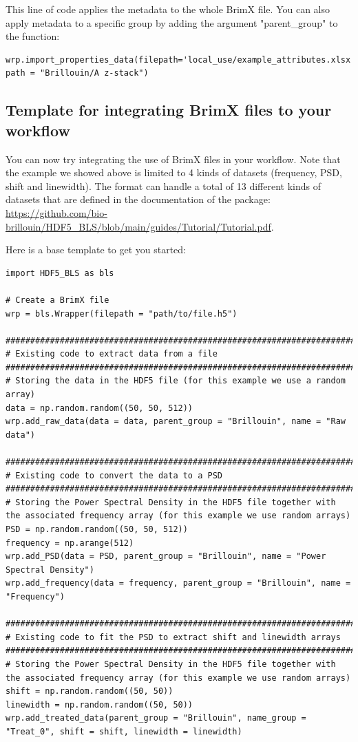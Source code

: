 \documentclass{article}
\begin{document}
This line of code applies the metadata to the whole BrimX file. You can also apply metadata to a specific group by adding the argument "parent\_group" to the function:

\begin{lstlisting}
wrp.import_properties_data(filepath='local_use/example_attributes.xlsx', path = "Brillouin/A z-stack")
\end{lstlisting}


\subsection{Template for integrating BrimX files to your workflow}

You can now try integrating the use of BrimX files in your workflow. Note that the example we showed above is limited to 4 kinds of datasets (frequency, PSD, shift and linewidth). The format can handle a total of 13 different kinds of datasets that are defined in the documentation of the package: \url{https://github.com/bio-brillouin/HDF5_BLS/blob/main/guides/Tutorial/Tutorial.pdf}.

Here is a base template to get you started:

\begin{lstlisting}
import HDF5_BLS as bls

# Create a BrimX file
wrp = bls.Wrapper(filepath = "path/to/file.h5")

###############################################################################
# Existing code to extract data from a file
###############################################################################
# Storing the data in the HDF5 file (for this example we use a random array)
data = np.random.random((50, 50, 512))
wrp.add_raw_data(data = data, parent_group = "Brillouin", name = "Raw data")

###############################################################################
# Existing code to convert the data to a PSD
###############################################################################
# Storing the Power Spectral Density in the HDF5 file together with the associated frequency array (for this example we use random arrays)
PSD = np.random.random((50, 50, 512))
frequency = np.arange(512)
wrp.add_PSD(data = PSD, parent_group = "Brillouin", name = "Power Spectral Density")
wrp.add_frequency(data = frequency, parent_group = "Brillouin", name = "Frequency")

###############################################################################
# Existing code to fit the PSD to extract shift and linewidth arrays
###############################################################################
# Storing the Power Spectral Density in the HDF5 file together with the associated frequency array (for this example we use random arrays)
shift = np.random.random((50, 50))
linewidth = np.random.random((50, 50))
wrp.add_treated_data(parent_group = "Brillouin", name_group = "Treat_0", shift = shift, linewidth = linewidth)
\end{lstlisting}
\end{document}

